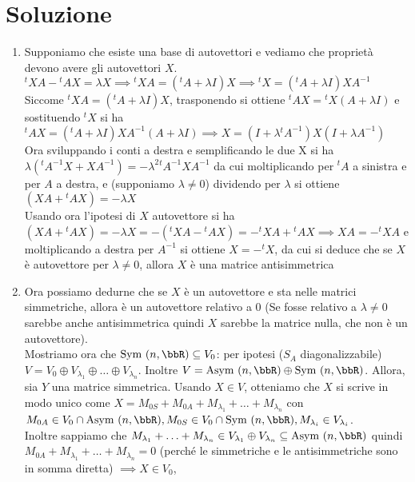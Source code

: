 \documentclass[a4paper,NoNotes,GeneralMath]{stdmdoc}
\begin{document}
	\section*{Soluzione}
	\begin{enumerate}
		\item Supponiamo che esiste una base di autovettori e vediamo che proprietà devono avere gli autovettori $X$. \\
			${}^tXA - {}^tAX = \lambda X \implies {}^tXA = ({}^tA + \lambda I) X \implies {}^tX = ({}^tA + \lambda I) X A^{-1}$ \\
			Siccome ${}^tXA = ({}^tA + \lambda I) X$, trasponendo si ottiene ${}^tAX = {}^tX (A + \lambda I)$ e sostituendo ${}^tX$ si ha
				${}^tAX = ({}^tA + \lambda I) X A^{-1} (A + \lambda I) \implies X = (I + \lambda {}^tA^{-1}) X (I + \lambda A^{-1})$ \\
			Ora sviluppando i conti a destra e semplificando le due X si ha $\lambda ({}^tA^{-1} X + X A^{-1}) = - \lambda^2 {}^tA^{-1} X A^{-1} $ da cui
				moltiplicando per ${}^tA$ a sinistra e per $A$ a destra, e (supponiamo $\lambda \neq 0$) dividendo per $\lambda$ si ottiene
				$(XA + {}^tAX) = - \lambda X$ \\
			Usando ora l'ipotesi di $X$ autovettore si ha $(XA + {}^tAX) = -\lambda X = - ({}^tXA - {}^tAX) = -{}^tXA + {}^tAX \implies XA = -{}^tXA$ e
				moltiplicando a destra per $A^{-1}$ si ottiene $X = -{}^tX$, da cui si deduce che se $X$ è autovettore per $\lambda \neq 0$, allora
				$X$ è una matrice antisimmetrica
		\item Ora possiamo dedurne che se $X$ è un autovettore e sta nelle matrici simmetriche, allora è un autovettore relativo a $0$ (Se fosse
				relativo a $\lambda \neq 0$ sarebbe anche antisimmetrica quindi $X$ sarebbe la matrice nulla, che non è un autovettore). \\
			Mostriamo ora che $\Symm(n,\bbR) \subseteq V_0$: per ipotesi ($S_A$ diagonalizzabile) $V = V_0 \oplus V_{\lambda_1} \oplus \ldots
				\oplus V_{\lambda_n}$. Inoltre $V = \Asymm(n, \bbR) \oplus \Symm(n, \bbR)$. Allora, sia $Y$ una matrice simmetrica. Usando $X \in V$,
				otteniamo che $X$ si scrive in modo unico come $X = M_{0S} + M_{0A} + M_{\lambda_1} + \ldots + M_{\lambda_n}$ con $M_{0A} \in V_0 \cap
				\Asymm(n, \bbR), M_{0S} \in V_0 \cap \Symm(n,\bbR) , M_{\lambda_i} \in V_{\lambda_i}$. \\
			Inoltre sappiamo che $M_{\lambda_1} + \ldots + M_{\lambda_n} \in V_{\lambda_1} \oplus V_{\lambda_n} \subseteq \Asymm(n, \bbR)$ quindi
				$M_{0A} + M_{\lambda_1} + \ldots + M_{\lambda_n} = 0$ (perché le simmetriche e le antisimmetriche sono in somma diretta) $\implies X \in V_0$,

\end{enumerate}
\end{document}
